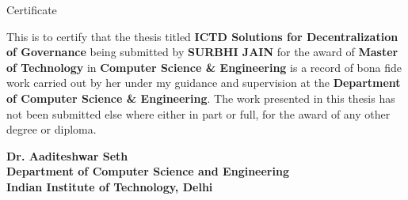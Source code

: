 \begin{center}
\LARGE{ Certificate} 
\end{center}

\vspace{0.5in}

This is to certify that the thesis titled {\bfseries ICTD Solutions for Decentralization of Governance} being submitted by
{\bfseries SURBHI JAIN} for the award of {\bfseries Master of Technology} in {\bfseries Computer Science \& Engineering} is a record of bona fide work carried out by her under my guidance and supervision at the {\bfseries Department of Computer Science \& Engineering}. The work presented in this thesis has not been submitted else where either in part or full, for the award of any other degree or diploma.

\vspace{1.5in}


{\bfseries Dr. Aaditeshwar Seth} \\
{\bfseries Department of Computer Science and Engineering} \\
{\bfseries Indian Institute of Technology, Delhi}\\ 
